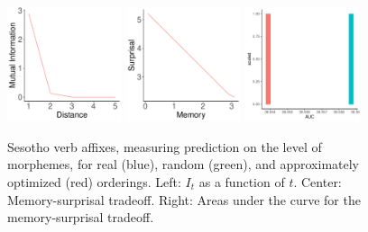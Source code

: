 \documentclass[11pt,letterpaper]{article}
\begin{document}
\begin{figure}
\begin{center}
\includegraphics[width=0.3\textwidth]{figures/Sesotho-suffixes-byMorphemes-it-heldout.pdf}
\includegraphics[width=0.3\textwidth]{figures/Sesotho-suffixes-byMorphemes-memsurp-heldout.pdf}
\includegraphics[width=0.3\textwidth]{figures/Sesotho-suffixes-byMorphemes-auc-hist-heldout.pdf}
\end{center}
	\caption{Sesotho verb affixes, measuring prediction on the level of morphemes, for real (blue), random (green), and approximately optimized (red) orderings. Left: $I_t$ as a function of $t$. Center: Memory-surprisal tradeoff. Right: Areas under the curve for the memory-surprisal tradeoff.}\label{fig:sesotho-morph}
\end{figure}


\end{document}
